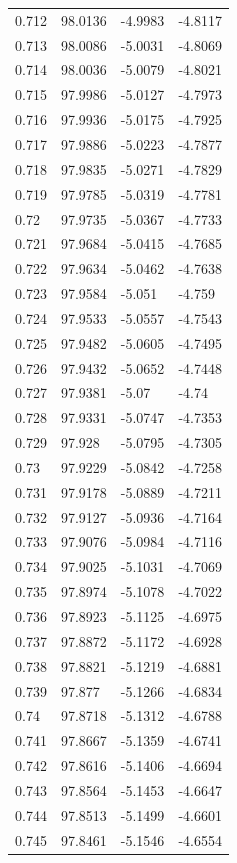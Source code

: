 \begin{tabular}{llll}
0.712 & 98.0136 & -4.9983 & -4.8117 \\
0.713 & 98.0086 & -5.0031 & -4.8069 \\
0.714 & 98.0036 & -5.0079 & -4.8021 \\
0.715 & 97.9986 & -5.0127 & -4.7973 \\
0.716 & 97.9936 & -5.0175 & -4.7925 \\
0.717 & 97.9886 & -5.0223 & -4.7877 \\
0.718 & 97.9835 & -5.0271 & -4.7829 \\
0.719 & 97.9785 & -5.0319 & -4.7781 \\
0.72 & 97.9735 & -5.0367 & -4.7733 \\
0.721 & 97.9684 & -5.0415 & -4.7685 \\
0.722 & 97.9634 & -5.0462 & -4.7638 \\
0.723 & 97.9584 & -5.051 & -4.759 \\
0.724 & 97.9533 & -5.0557 & -4.7543 \\
0.725 & 97.9482 & -5.0605 & -4.7495 \\
0.726 & 97.9432 & -5.0652 & -4.7448 \\
0.727 & 97.9381 & -5.07 & -4.74 \\
0.728 & 97.9331 & -5.0747 & -4.7353 \\
0.729 & 97.928 & -5.0795 & -4.7305 \\
0.73 & 97.9229 & -5.0842 & -4.7258 \\
0.731 & 97.9178 & -5.0889 & -4.7211 \\
0.732 & 97.9127 & -5.0936 & -4.7164 \\
0.733 & 97.9076 & -5.0984 & -4.7116 \\
0.734 & 97.9025 & -5.1031 & -4.7069 \\
0.735 & 97.8974 & -5.1078 & -4.7022 \\
0.736 & 97.8923 & -5.1125 & -4.6975 \\
0.737 & 97.8872 & -5.1172 & -4.6928 \\
0.738 & 97.8821 & -5.1219 & -4.6881 \\
0.739 & 97.877 & -5.1266 & -4.6834 \\
0.74 & 97.8718 & -5.1312 & -4.6788 \\
0.741 & 97.8667 & -5.1359 & -4.6741 \\
0.742 & 97.8616 & -5.1406 & -4.6694 \\
0.743 & 97.8564 & -5.1453 & -4.6647 \\
0.744 & 97.8513 & -5.1499 & -4.6601 \\
0.745 & 97.8461 & -5.1546 & -4.6554 \\

\end{tabular}

